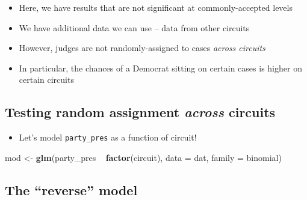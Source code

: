 \documentclass[12pt,twoside]{article}
\newenvironment{Shaded}{}{}
\newcommand{\KeywordTok}[1]{\textcolor[rgb]{0.00,0.44,0.13}{\textbf{{#1}}}}
\newcommand{\DataTypeTok}[1]{\textcolor[rgb]{0.56,0.13,0.00}{{#1}}}
\newcommand{\StringTok}[1]{\textcolor[rgb]{0.25,0.44,0.63}{{#1}}}
\newcommand{\NormalTok}[1]{{#1}}
\providecommand{\tightlist}{%
  \setlength{\itemsep}{0pt}\setlength{\parskip}{0pt}}
\begin{document}
\begin{itemize}
\tightlist
\item
  Here, we have results that are not significant at commonly-accepted
  levels
\item
  We have additional data we can use -- data from other circuits
\item
  However, judges are not randomly-assigned to cases \emph{across
  circuits}
\item
  In particular, the chances of a Democrat sitting on certain cases is
  higher on certain circuits
\end{itemize}

\subsection{\texorpdfstring{Testing random assignment \emph{across}
circuits}{Testing random assignment across circuits}}\label{testing-random-assignment-across-circuits}

\begin{itemize}
\tightlist
\item
  Let's model \texttt{party\_pres} as a function of circuit!
\end{itemize}

\begin{Shaded}
\begin{Highlighting}[]
\NormalTok{mod <-}\StringTok{ }\KeywordTok{glm}\NormalTok{(party_pres ~}\StringTok{ }\KeywordTok{factor}\NormalTok{(circuit),}
           \DataTypeTok{data =} \NormalTok{dat,}
           \DataTypeTok{family =} \NormalTok{binomial)}
\end{Highlighting}
\end{Shaded}

\subsection{\texorpdfstring{The ``reverse''
model}{The reverse model}}\label{the-reverse-model}

\scriptsize
\end{document}

